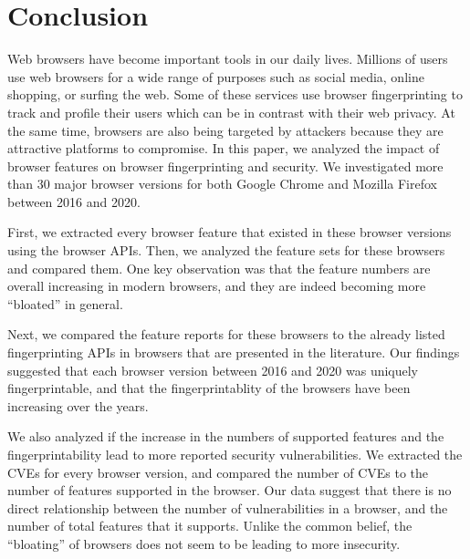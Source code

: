 \section{Conclusion}
\label{sec:conclusion}

Web browsers have become important tools in our daily lives.
Millions of users use web browsers for a wide range of purposes such
as social media, online shopping, or surfing the web. Some of these
services use browser fingerprinting to track and profile their users
which can be in contrast with their web privacy. At the same time,
browsers are also being targeted by attackers because they are
attractive platforms to compromise. In this paper, we analyzed the
impact of browser features on browser fingerprinting and security. We
investigated more than 30 major browser versions for both Google
Chrome and Mozilla Firefox between 2016 and 2020.

First, we extracted every browser feature that existed in these
browser versions using the browser APIs. Then, we analyzed the feature
sets for these browsers and compared them. One key observation was
that the feature numbers are overall increasing in modern browsers,
and they are indeed becoming more ``bloated'' in general.

Next, we compared the feature reports for these browsers to the
already listed fingerprinting APIs in browsers that are presented in the
literature. Our findings suggested that each browser version between 2016
and 2020 was uniquely fingerprintable, and that the fingerprintablity
of the browsers have been increasing over the years.

We also analyzed if the increase in the numbers of supported features
and the fingerprintability lead to more reported security
vulnerabilities. We extracted the CVEs for every browser version, and
compared the number of CVEs to the number of features supported in the
browser. Our data suggest that there is no direct relationship
between the number of vulnerabilities in a browser, and the number of
total features that it supports. Unlike the common belief, the
``bloating'' of browsers does not seem to be leading to more
insecurity.
